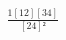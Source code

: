 \documentclass[varwidth, border=5pt]{standalone}
\begin{document}
\begin{my}
$\begin{gathered}
\scriptscriptstyle\frac{1[12][34]}{[24]²}
\end{gathered}$
\end{my}
\end{document}
